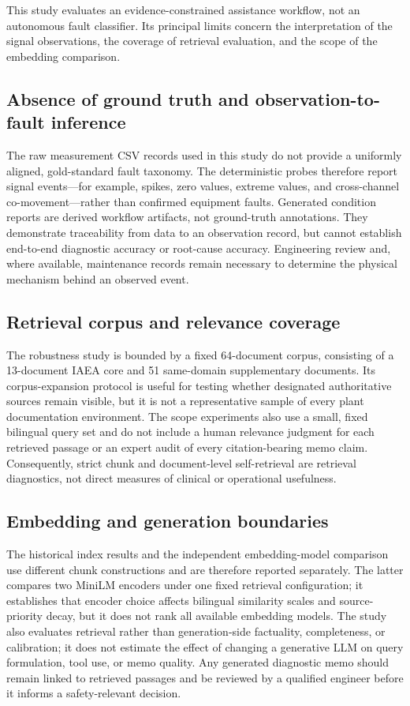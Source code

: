 This study evaluates an evidence-constrained assistance workflow, not an autonomous fault classifier. Its principal limits concern the interpretation of the signal observations, the coverage of retrieval evaluation, and the scope of the embedding comparison.

\subsection{Absence of ground truth and observation-to-fault inference}
The raw measurement CSV records used in this study do not provide a uniformly aligned, gold-standard fault taxonomy. The deterministic probes therefore report signal events---for example, spikes, zero values, extreme values, and cross-channel co-movement---rather than confirmed equipment faults. Generated condition reports are derived workflow artifacts, not ground-truth annotations. They demonstrate traceability from data to an observation record, but cannot establish end-to-end diagnostic accuracy or root-cause accuracy. Engineering review and, where available, maintenance records remain necessary to determine the physical mechanism behind an observed event.

\subsection{Retrieval corpus and relevance coverage}
The robustness study is bounded by a fixed 64-document corpus, consisting of a 13-document IAEA core and 51 same-domain supplementary documents. Its corpus-expansion protocol is useful for testing whether designated authoritative sources remain visible, but it is not a representative sample of every plant documentation environment. The scope experiments also use a small, fixed bilingual query set and do not include a human relevance judgment for each retrieved passage or an expert audit of every citation-bearing memo claim. Consequently, strict chunk and document-level self-retrieval are retrieval diagnostics, not direct measures of clinical or operational usefulness.

\subsection{Embedding and generation boundaries}
The historical index results and the independent embedding-model comparison use different chunk constructions and are therefore reported separately. The latter compares two MiniLM encoders under one fixed retrieval configuration; it establishes that encoder choice affects bilingual similarity scales and source-priority decay, but it does not rank all available embedding models. The study also evaluates retrieval rather than generation-side factuality, completeness, or calibration; it does not estimate the effect of changing a generative LLM on query formulation, tool use, or memo quality. Any generated diagnostic memo should remain linked to retrieved passages and be reviewed by a qualified engineer before it informs a safety-relevant decision.

